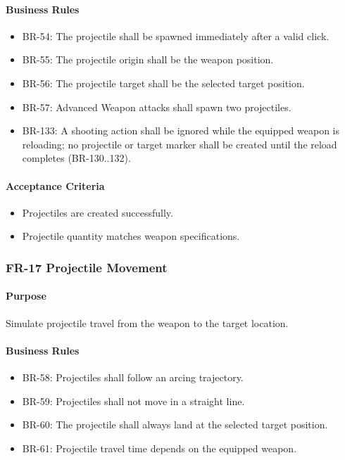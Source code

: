 \documentclass[11pt,a4paper]{article}
\begin{document}
\paragraph{Business Rules}
\begin{itemize}
  \item BR-54: The projectile shall be spawned immediately after a valid click.
  \item BR-55: The projectile origin shall be the weapon position.
  \item BR-56: The projectile target shall be the selected target position.
  \item BR-57: Advanced Weapon attacks shall spawn two projectiles.
  \item BR-133: A shooting action shall be ignored while the equipped weapon is
        reloading; no projectile or target marker shall be created until the
        reload completes (BR-130..132).
\end{itemize}

\paragraph{Acceptance Criteria}
\begin{itemize}
  \item Projectiles are created successfully.
  \item Projectile quantity matches weapon specifications.
\end{itemize}

\subsubsection{FR-17 Projectile Movement}

\paragraph{Purpose}
Simulate projectile travel from the weapon to the target location.

\paragraph{Business Rules}
\begin{itemize}
  \item BR-58: Projectiles shall follow an arcing trajectory.
  \item BR-59: Projectiles shall not move in a straight line.
  \item BR-60: The projectile shall always land at the selected target position.
  \item BR-61: Projectile travel time depends on the equipped weapon.
\end{itemize}
\end{document}
